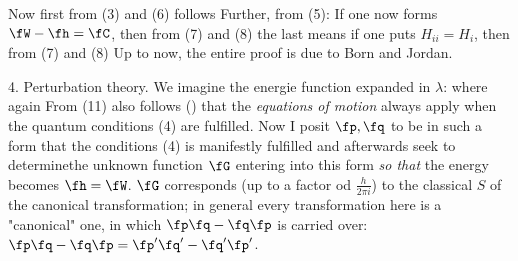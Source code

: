 Now first from (3) and (6) follows
Further, from (5):
If one now forms $\fW - \fh = \fC$, then from (7) and (8)
the last means
if one puts $H_{ii} = H_i$, then from (7) and (8)
Up to now, the entire proof is due to Born and Jordan.

4. Perturbation theory. We imagine the energie function expanded in $\lambda$:
where again
From (11) also follows () that the \textit{equations of motion} always apply when the quantum conditions (4) are fulfilled. Now I posit $\fp,\fq$ to be in such a form that the conditions (4) is manifestly fulfilled and afterwards seek to determinethe unknown function $\fG$ entering into this form \textit{so that} the energy becomes $\fh = \fW$. $\fG$ corresponds (up to a factor od $\frac{h}{2\pi i}$) to the classical $S$ of the canonical transformation; in general every transformation here is a "canonical" one, in which $\fp\fq - \fq\fp$ is carried over: $\fp\fq - \fq\fp = \fp'\fq' - \fq'\fp'$.

